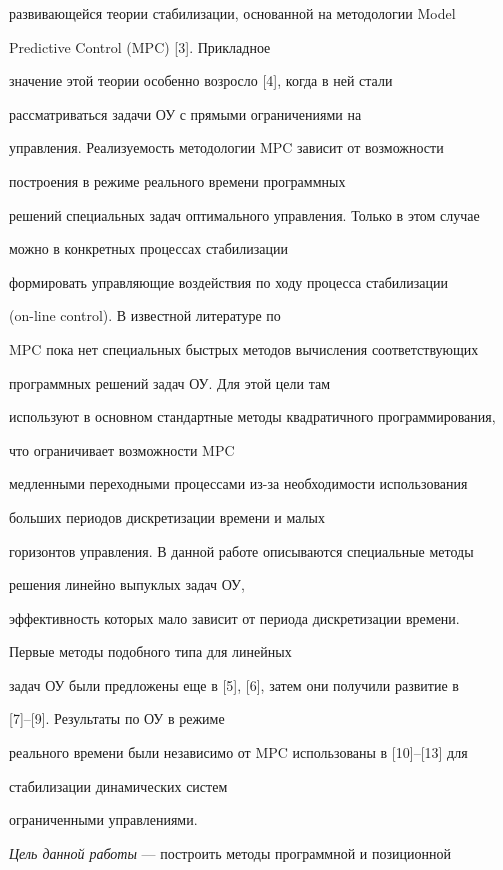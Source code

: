 развивающейся теории стабилизации, основанной на методологии Model


Predictive Control (MPC) [3]. Прикладное


значение этой теории особенно возросло [4], когда в ней стали


рассматриваться задачи ОУ с прямыми ограничениями на


управления. Реализуемость методологии MPC зависит от возможности


построения в режиме реального времени программных


решений специальных задач оптимального управления. Только в этом случае


можно в конкретных процессах стабилизации


формировать управляющие воздействия по ходу процесса стабилизации


(on-line control). В известной литературе по


MPC пока нет специальных быстрых методов вычисления соответствующих


программных решений задач ОУ. Для этой цели там


используют в основном стандартные методы квадратичного программирования,


что ограничивает возможности MPC


медленными переходными процессами из-за необходимости использования


больших периодов дискретизации времени и малых


горизонтов управления. В данной работе описываются специальные методы


решения линейно выпуклых задач ОУ,


эффективность которых мало зависит от периода дискретизации времени.


Первые методы подобного типа для линейных


задач ОУ были предложены еще в [5], [6], затем они получили развитие в


[7]--[9]. Результаты по ОУ в режиме


реального времени были независимо от MPC использованы в [10]--[13] для


стабилизации динамических систем


ограниченными управлениями.





{\it Цель данной работы} --- построить методы программной и позиционной


